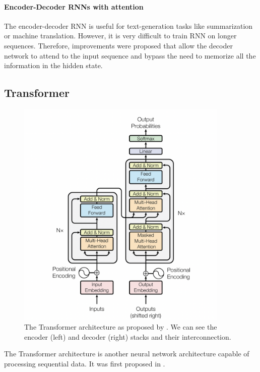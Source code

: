 \paragraph{Encoder-Decoder RNNs with attention}
The encoder-decoder RNN is useful for text-generation tasks like summarization or machine translation.
However, it is very difficult to train RNN on longer sequences.
Therefore, improvements were proposed \cite{bahdanau2014neural,luong-etal-2015-effective} that allow the decoder network to attend to the input sequence and bypass the need to memorize all the information in the hidden state.

\subsection{Transformer}
\label{background:trafo}
\begin{figure}[ht]
    \centering
    \includegraphics[width=0.9\textwidth]{images/transfo-arch.png}
    \caption{The Transformer architecture as proposed by \citep{vaswani2017attention}. We can see the encoder (left) and decoder (right) stacks and their interconnection.}
    \label{fig:trafo}
\end{figure}
The Transformer architecture is another neural network architecture capable of processing sequential data.
It was first proposed in \citet{vaswani2017attention}.
